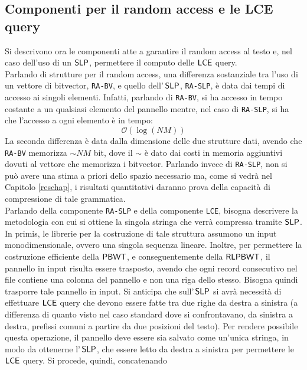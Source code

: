 \subsection{Componenti per il random access e le LCE query}
Si descrivono ora le componenti atte a garantire il
random access
al testo e, nel caso dell'uso di un $\mbox{\rm {\sf SLP}}$, permettere il computo delle
$\mbox{\rm {\sf LCE}}$ query.\\
Parlando di strutture per il random access, una differenza sostanziale tra
l'uso di un vettore di bitvector, \texttt{RA-BV}, e quello
dell'$\,\mbox{\rm {\sf SLP}}$, \texttt{RA-SLP}, è data dai tempi di accesso ai singoli
elementi. Infatti, parlando di \texttt{RA-BV}, si ha accesso in tempo costante
a un qualsiasi elemento del pannello mentre, nel caso di \texttt{RA-SLP}, si ha
che l'accesso a ogni elemento è in tempo:
\begin{equation}
  \label{eq:timera}
  \mathcal{O}(\log (NM))
\end{equation}
La seconda differenza è data
dalla dimensione delle due strutture dati, avendo che \texttt{RA-BV} memorizza
$\sim NM$ bit, dove il $\sim$ è dato dai costi in memoria aggiuntivi dovuti
al vettore che memorizza i bitvector. Parlando invece di
\texttt{RA-SLP}, non si può avere una stima a priori dello spazio necessario ma,
come si vedrà nel Capitolo \ref{reschap}, i risultati quantitativi daranno prova
della capacità di compressione di tale grammatica.\\
Parlando della componente \texttt{RA-SLP} e della componente
\texttt{LCE}, bisogna descrivere la metodologia con cui 
si ottiene la singola stringa che verrà compressa tramite $\mbox{\rm {\sf SLP}}$.
In primis, le
librerie per la costruzione di tale struttura assumono un input
monodimensionale, ovvero una singola sequenza lineare. Inoltre, per
permettere la costruzione efficiente della $\mbox{\rm {\sf PBWT}}$, e conseguentemente
della $\mbox{\rm {\sf RLPBWT}}$, il pannello in input risulta essere trasposto, avendo che
ogni record consecutivo nel file contiene una colonna del pannello e non una
riga dello stesso. Bisogna
quindi trasporre tale pannello in input. Si anticipa che sull'$\,\mbox{\rm {\sf SLP}}$
si avrà  
necessità di effettuare $\mbox{\rm {\sf LCE}}$ query che devono essere fatte tra
due righe da destra a sinistra (a differenza 
di quanto visto nel caso standard dove si confrontavano, da sinistra a destra,
prefissi comuni a partire da due posizioni del testo). Per
rendere possibile questa operazione, il pannello deve essere sia 
salvato come un'unica stringa, in modo da ottenerne l'$\,\mbox{\rm {\sf SLP}}$, che essere letto
da destra 
a sinistra per permettere le $\mbox{\rm {\sf LCE}}$ query. Si
procede, quindi, concatenando 
